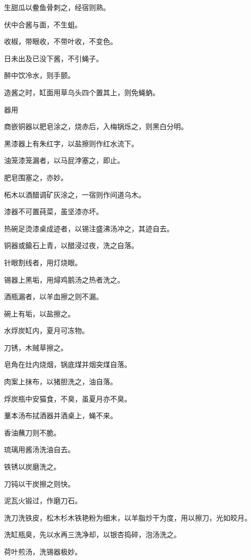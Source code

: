 \documentclass[a4paper,12pt,UTF8,twoside]{ctexbook}
\begin{document}
    生甜瓜以鲞鱼骨刺之，经宿则熟。
    
    伏中合酱与面，不生蛆。
    
    收椒，带眼收，不带叶收，不变色。
    
    日未出及已没下酱，不引蝇子。
    
    醉中饮冷水，则手颤。
    
    造酱之时，缸面用草乌头四个置其上，则免蝇蚋。
    
    器用
    
    商嵌铜器以肥皂涂之，烧赤后，入梅锅烁之，则黑白分明。
    
    黑漆器上有朱红字，以盐擦则作红水流下。
    
    油笼漆笼漏者，以马屁浡塞之，即止。
    
    肥皂围塞之，亦妙。
    
    柘木以酒醋调矿灰涂之，一宿则作间道乌木。
    
    漆器不可置莼菜，虽坚漆亦坏。
    
    热碗足烫漆桌成迹者，以锡注盛沸汤冲之，其迹自去。
    
    铜器或鍮石上青，以醋浸过夜，洗之自落。
    
    针眼割线者，用灯烧眼。
    
    锡器上黑垢，用燖鸡鹅汤之热者洗之。
    
    酒瓶漏者，以羊血擦之则不漏。
    
    碗上有垢，以盐擦之。
    
    水烰炭缸内，夏月可冻物。
    
    刀锈，木贼草擦之。
    
    皂角在灶内烧烟，锅底煤并烟突煤自落。
    
    肉案上抹布，以猪胆洗之，油自落。
    
    烰炭瓶中安猫食，不臭，虽夏月亦不臭。
    
    藳本汤布拭酒器并酒桌上，蝇不来。
    
    香油蘸刀则不脆。
    
    琉璃用酱汤洗油自去。
    
    铁锈以炭磨洗之。
    
    刀钝以干炭擦之则快。
    
    泥瓦火锻过，作磨刀石。
    
    洗刀洗铁皮，松木杉木铁艳粉为细末，以羊脂炒干为度，用以擦刀，光如皎月。
    
    洗缸瓶臭，先以水再三洗净却，以银杏捣碎，泡汤洗之。
    
    荷叶煎汤，洗锡器极妙。
    
\end{document}
